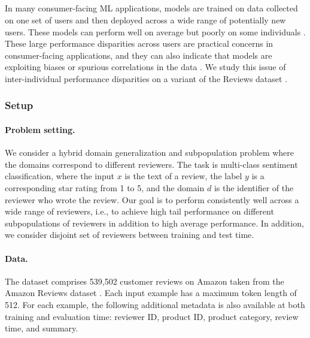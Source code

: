 \subsection{\Amazon}\label{sec:app_amazon}

In many consumer-facing ML applications, models are trained on data collected on one set of users and then deployed across a wide range of potentially new users. These models can perform well on average but poorly on some individuals \citep{tatman2017,caldas2018leaf,li2019fair,koenecke2020racial}.
These large performance disparities across users are practical concerns in consumer-facing applications, and they can also indicate that models are exploiting biases or spurious correlations in the data \citep{badgeley2019deep,geva2019annotator}.
We study this issue of inter-individual performance disparities on a variant of the \Amazon Reviews dataset \citep{ni2019justifying}.

\subsubsection{Setup}
\paragraph{Problem setting.}
We consider a hybrid domain generalization and subpopulation problem where the domains correspond to different reviewers.
The task is multi-class sentiment classification, where the input $x$ is the text of a review, the label $y$ is a corresponding star rating from 1 to 5, and the domain $d$ is the identifier of the reviewer who wrote the review.
Our goal is to perform consistently well across a wide range of reviewers, i.e., to achieve high tail performance on different subpopulations of reviewers in addition to high average performance. In addition, we consider disjoint set of reviewers between training and test time.

\paragraph{Data.}
The dataset comprises 539,502 customer reviews on Amazon taken from the Amazon Reviews dataset \citep{ni2019justifying}.
Each input example has a maximum token length of 512.
For each example, the following additional metadata is also available at both training and evaluation time: reviewer ID, product ID, product category, review time, and summary.

